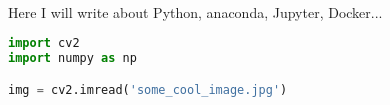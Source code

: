  
\lstset{style=mystyle}

\paragraph{}
Here I will write about Python, anaconda, Jupyter, Docker...

\begin{lstlisting}[language=Python, caption=Python test code]
import cv2
import numpy as np

img = cv2.imread('some_cool_image.jpg')
\end{lstlisting}